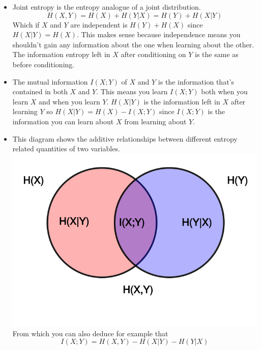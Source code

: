 \begin{itemize}
    \item 
        Joint entropy is the entropy analogue of a joint distribution.
        $$H(X,Y) = H(X) + H(Y|X) = H(Y) + H(X|Y)$$
        Which if $X$ and $Y$ are independent is $H(Y) + H(X)$ since
        $H(X|Y) = H(X)$. This makes sense because independence means you shouldn't gain any information about the one when learning about the other. The information entropy left in $X$ after conditioning on $Y$ is the same as before conditioning.
    \item
        The mutual information $I(X;Y)$ of $X$ and $Y$ is the information that's contained in both $X$ and $Y$. This means you learn $I(X;Y)$ both when you learn $X$ and when you learn $Y$. $H(X|Y)$ is the information left in $X$ after learning $Y$ so $H(X|Y) = H(X) - I(X;Y)$ since $I(X;Y)$ is the information you can learn about $X$ from learning about $Y$.
    \item
        This diagram shows the additive relationships between different entropy related quantities of two variables.
        \includegraphics{additive_entropy}
        From which you can also deduce for example that 
        $$I(X;Y) = H(X,Y) - H(X|Y) - H(Y|X)$$
\end{itemize}

